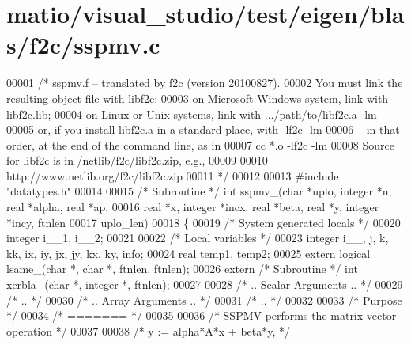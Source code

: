 \hypertarget{matio_2visual__studio_2test_2eigen_2blas_2f2c_2sspmv_8c_source}{}\section{matio/visual\+\_\+studio/test/eigen/blas/f2c/sspmv.c}
\label{matio_2visual__studio_2test_2eigen_2blas_2f2c_2sspmv_8c_source}

\begin{DoxyCode}
00001 \textcolor{comment}{/* sspmv.f -- translated by f2c (version 20100827).}
00002 \textcolor{comment}{   You must link the resulting object file with libf2c:}
00003 \textcolor{comment}{    on Microsoft Windows system, link with libf2c.lib;}
00004 \textcolor{comment}{    on Linux or Unix systems, link with .../path/to/libf2c.a -lm}
00005 \textcolor{comment}{    or, if you install libf2c.a in a standard place, with -lf2c -lm}
00006 \textcolor{comment}{    -- in that order, at the end of the command line, as in}
00007 \textcolor{comment}{        cc *.o -lf2c -lm}
00008 \textcolor{comment}{    Source for libf2c is in /netlib/f2c/libf2c.zip, e.g.,}
00009 \textcolor{comment}{}
00010 \textcolor{comment}{        http://www.netlib.org/f2c/libf2c.zip}
00011 \textcolor{comment}{*/}
00012 
00013 \textcolor{preprocessor}{#include "datatypes.h"}
00014 
00015 \textcolor{comment}{/* Subroutine */} \textcolor{keywordtype}{int} sspmv\_(\textcolor{keywordtype}{char} *uplo, integer *n, real *alpha, real *ap, 
00016     real *x, integer *incx, real *beta, real *y, integer *incy, ftnlen 
00017     uplo\_len)
00018 \{
00019     \textcolor{comment}{/* System generated locals */}
00020     integer i\_\_1, i\_\_2;
00021 
00022     \textcolor{comment}{/* Local variables */}
00023     integer i\_\_, j, k, kk, ix, iy, jx, jy, kx, ky, info;
00024     real temp1, temp2;
00025     \textcolor{keyword}{extern} logical lsame\_(\textcolor{keywordtype}{char} *, \textcolor{keywordtype}{char} *, ftnlen, ftnlen);
00026     \textcolor{keyword}{extern} \textcolor{comment}{/* Subroutine */} \textcolor{keywordtype}{int} xerbla\_(\textcolor{keywordtype}{char} *, integer *, ftnlen);
00027 
00028 \textcolor{comment}{/*     .. Scalar Arguments .. */}
00029 \textcolor{comment}{/*     .. */}
00030 \textcolor{comment}{/*     .. Array Arguments .. */}
00031 \textcolor{comment}{/*     .. */}
00032 
00033 \textcolor{comment}{/*  Purpose */}
00034 \textcolor{comment}{/*  ======= */}
00035 
00036 \textcolor{comment}{/*  SSPMV  performs the matrix-vector operation */}
00037 
00038 \textcolor{comment}{/*     y := alpha*A*x + beta*y, */}

\end{DoxyCode}
